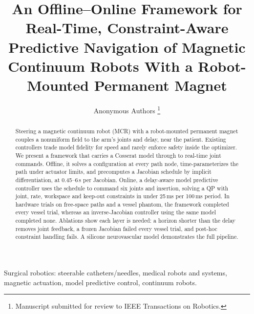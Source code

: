 \documentclass[journal]{IEEEtran}
\begin{document}
\title{An Offline--Online Framework for Real-Time, Constraint-Aware
Predictive Navigation of Magnetic Continuum Robots With a Robot-Mounted
Permanent Magnet}

\author{Anonymous Authors%
\thanks{Manuscript submitted for review to IEEE Transactions on Robotics.}}


\maketitle

\begin{abstract}
Steering a magnetic continuum robot (MCR) with a robot-mounted permanent
magnet couples a nonuniform field to the arm's joints and delay, near
the patient. Existing controllers trade model fidelity for speed and rarely enforce
safety inside the optimizer. We present a framework that carries a Cosserat model through to
real-time joint commands.
Offline, it solves a configuration at every path node, time-parameterizes
the path under actuator limits, and precomputes a Jacobian schedule by
implicit differentiation, at 0.45--6\,s per Jacobian. Online, a
delay-aware model predictive controller uses the schedule to command six joints and insertion, solving a QP with
joint, rate, workspace and keep-out constraints in under 25\,ms per
100\,ms period. In hardware trials on free-space paths and a vessel phantom, the
framework completed every vessel trial, whereas an inverse-Jacobian controller using
the same model completed none. Ablations show each layer is needed: a horizon shorter than the delay
removes joint feedback, a frozen Jacobian failed every vessel
trial, and post-hoc constraint handling fails. A silicone neurovascular model demonstrates the full pipeline.
\end{abstract}

\begin{IEEEkeywords}
Surgical robotics: steerable catheters/needles, medical robots and
systems, magnetic actuation, model predictive control, continuum robots.
\end{IEEEkeywords}
\end{document}
